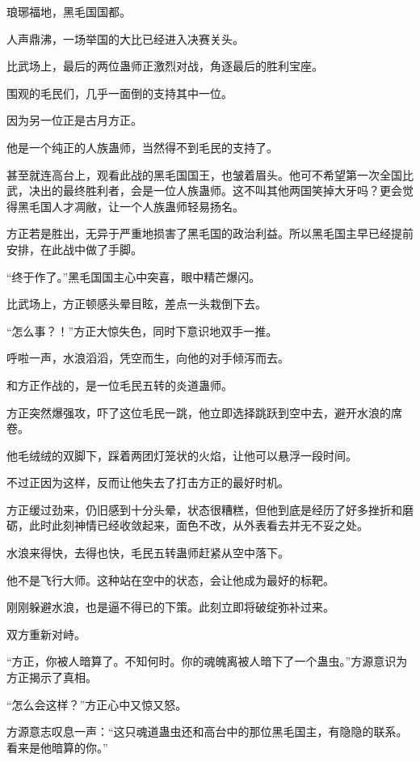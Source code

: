 
\begin{this_body}

琅琊福地，黑毛国国都。

人声鼎沸，一场举国的大比已经进入决赛关头。

比武场上，最后的两位蛊师正激烈对战，角逐最后的胜利宝座。

围观的毛民们，几乎一面倒的支持其中一位。

因为另一位正是古月方正。

他是一个纯正的人族蛊师，当然得不到毛民的支持了。

甚至就连高台上，观看此战的黑毛国国王，也皱着眉头。他可不希望第一次全国比武，决出的最终胜利者，会是一位人族蛊师。这不叫其他两国笑掉大牙吗？更会觉得黑毛国人才凋敝，让一个人族蛊师轻易扬名。

方正若是胜出，无异于严重地损害了黑毛国的政治利益。所以黑毛国主早已经提前安排，在此战中做了手脚。

“终于作了。”黑毛国国主心中突喜，眼中精芒爆闪。

比武场上，方正顿感头晕目眩，差点一头栽倒下去。

“怎么事？！”方正大惊失色，同时下意识地双手一推。

呼啦一声，水浪滔滔，凭空而生，向他的对手倾泻而去。

和方正作战的，是一位毛民五转的炎道蛊师。

方正突然爆强攻，吓了这位毛民一跳，他立即选择跳跃到空中去，避开水浪的席卷。

他毛绒绒的双脚下，踩着两团灯笼状的火焰，让他可以悬浮一段时间。

不过正因为这样，反而让他失去了打击方正的最好时机。

方正缓过劲来，仍旧感到十分头晕，状态很糟糕，但他到底是经历了好多挫折和磨砺，此时此刻神情已经收敛起来，面色不改，从外表看去并无不妥之处。

水浪来得快，去得也快，毛民五转蛊师赶紧从空中落下。

他不是飞行大师。这种站在空中的状态，会让他成为最好的标靶。

刚刚躲避水浪，也是逼不得已的下策。此刻立即将破绽弥补过来。

双方重新对峙。

“方正，你被人暗算了。不知何时。你的魂魄离被人暗下了一个蛊虫。”方源意识为方正揭示了真相。

“怎么会这样？”方正心中又惊又怒。

方源意志叹息一声：“这只魂道蛊虫还和高台中的那位黑毛国主，有隐隐的联系。看来是他暗算的你。”


\end{this_body}
